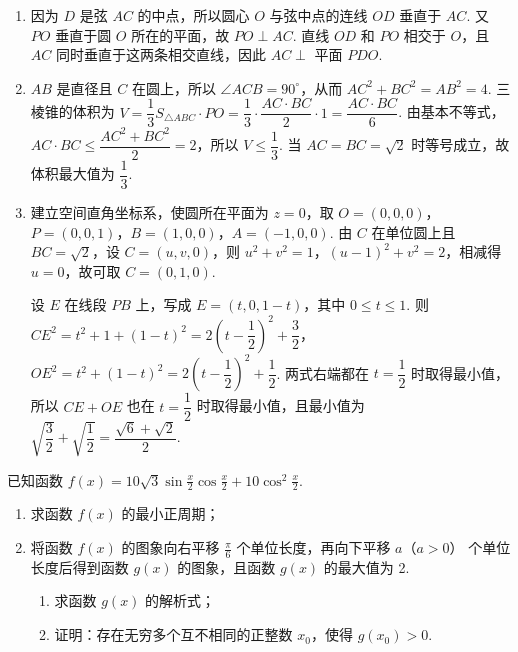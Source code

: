 \begin{solution}
\begin{enumerate}
\item 因为 \(D\) 是弦 \(AC\) 的中点，所以圆心 \(O\) 与弦中点的连线 \(OD\) 垂直于 \(AC\). 又 \(PO\) 垂直于圆 \(O\) 所在的平面，故 \(PO\perp AC\). 直线 \(OD\) 和 \(PO\) 相交于 \(O\)，且 \(AC\) 同时垂直于这两条相交直线，因此 \(AC\perp\) 平面 \(PDO\).
\item \(AB\) 是直径且 \(C\) 在圆上，所以 \(\angle ACB=90^{\circ}\)，从而 \(AC^2+BC^2=AB^2=4\). 三棱锥的体积为
\(V=\dfrac13 S_{\triangle ABC}\cdot PO=\dfrac13\cdot\dfrac{AC\cdot BC}{2}\cdot1=\dfrac{AC\cdot BC}{6}\).
由基本不等式，\(AC\cdot BC\leqslant\dfrac{AC^2+BC^2}{2}=2\)，所以 \(V\leqslant\dfrac13\). 当 \(AC=BC=\sqrt2\) 时等号成立，故体积最大值为 \(\dfrac13\).
\item 建立空间直角坐标系，使圆所在平面为 \(z=0\)，取 \(O=(0,0,0)\)，\(P=(0,0,1)\)，\(B=(1,0,0)\)，\(A=(-1,0,0)\). 由 \(C\) 在单位圆上且 \(BC=\sqrt2\)，设 \(C=(u,v,0)\)，则
\(u^2+v^2=1\)，\((u-1)^2+v^2=2\)，相减得 \(u=0\)，故可取 \(C=(0,1,0)\).

设 \(E\) 在线段 \(PB\) 上，写成 \(E=(t,0,1-t)\)，其中 \(0\leqslant t\leqslant1\). 则
\(CE^2=t^2+1+(1-t)^2=2\left(t-\dfrac12\right)^2+\dfrac32\)，
\(OE^2=t^2+(1-t)^2=2\left(t-\dfrac12\right)^2+\dfrac12\).
两式右端都在 \(t=\dfrac12\) 时取得最小值，所以 \(CE+OE\) 也在 \(t=\dfrac12\) 时取得最小值，且最小值为
\(\sqrt{\dfrac32}+\sqrt{\dfrac12}=\dfrac{\sqrt6+\sqrt2}{2}\).
\end{enumerate}
\end{solution}

\begin{problem}
已知函数 \( f(x) = 10\sqrt{3}\sin \frac{x}{2}\cos \frac{x}{2} + 10\cos^2\frac{x}{2} \).

\begin{enumerate}
\item 求函数 \( f(x) \) 的最小正周期；
\item 将函数 \( f(x) \) 的图象向右平移 \( \frac{\pi}{6} \) 个单位长度，再向下平移 \(a\)（\(a > 0\)） 个单位长度后得到函数 \( g(x) \) 的图象，且函数 \( g(x) \) 的最大值为 2.

\begin{enumerate}
\item 求函数 \( g(x) \) 的解析式；
\item 证明：存在无穷多个互不相同的正整数 \(x_0\)，使得 \(g(x_0) > 0\).
\end{enumerate}
\end{enumerate}
\end{problem}

